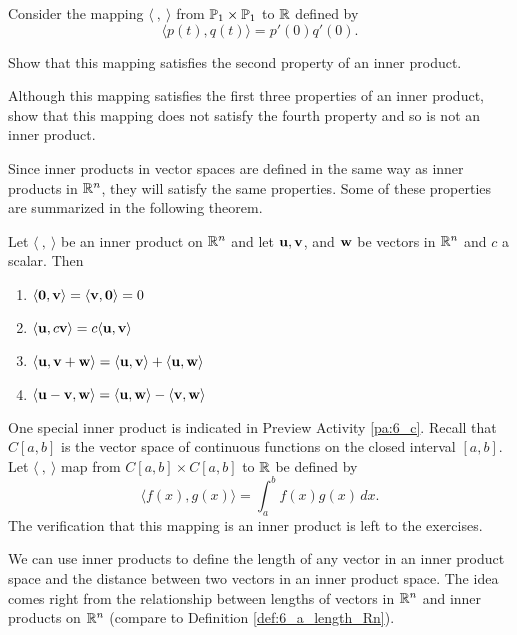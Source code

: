  \begin{activity} Consider the mapping $\langle \ , \ \rangle $ from $\mathbb{P}_1 \times \mathbb{P}_1$ to $\mathbb{R}$ defined by 
\[\langle p(t), q(t) \rangle = p'(0)q'(0).\]
\ba
\item Show that this mapping satisfies the second property of an inner product.

\item Although this mapping satisfies the first three properties of an inner product, show that this mapping does not satisfy the fourth property and so is not an inner product. 
\ea

\end{activity}


Since inner products in vector spaces are defined in the same way as inner products in $\mathbb{R}^n$, they will satisfy the same properties. Some of these properties are summarized in the following theorem.

\begin{theorem} \label{thm:6_c_inner_product_properties} Let $\langle \ , \ \rangle$ be an inner product on $\mathbb{R}^n$ and let $\mathbf{u}, \mathbf{v}$, and $\mathbf{w}$ be vectors in $\mathbb{R}^n$ and $c$ a scalar. Then
\begin{enumerate}
	\item $\langle \mathbf{0} , \mathbf{v} \rangle = \langle \mathbf{v} , \mathbf{0} \rangle = 0$
	\item $\langle \mathbf{u} , c\mathbf{v} \rangle = c\langle \mathbf{u} , \mathbf{v} \rangle$
	\item $\langle \mathbf{u} , \mathbf{v}+\mathbf{w} \rangle = \langle \mathbf{u} , \mathbf{v} \rangle + \langle \mathbf{u} , \mathbf{w} \rangle$
\item $\langle \mathbf{u} - \mathbf{v}, \mathbf{w} \rangle = \langle \mathbf{u} , \mathbf{w} \rangle - \langle \mathbf{v} , \mathbf{w} \rangle$
\end{enumerate}
\end{theorem}

One special inner product is indicated in Preview Activity \ref{pa:6_c}. Recall that $C[a,b]$ is the vector space of continuous functions on the closed interval $[a,b]$. Let $\langle \ ,  \ \rangle$ map from $C[a,b] \times C[a,b]$ to $\mathbb{R}$ be defined by 
\[\langle f(x), g(x) \rangle = \int_a^b f(x)g(x) \, dx.\]
The verification that this mapping is an inner product is left to the exercises. 

\label{sec:vec_length}

We can use inner products to define the length of any vector in an inner product space and the distance between two vectors in an inner product space. The idea comes right from the relationship between lengths of vectors in $\mathbb{R}^n$ and inner products on $\mathbb{R}^n$ (compare to Definition \ref{def:6_a_length_Rn}). 

